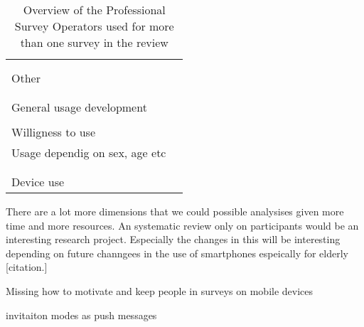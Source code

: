 \begin{table}
\begin{tabular}{ll}
        & \cite{antoun_effects_2017, mavletova_sensitive_2013}\\
        & \cite{toninelli_smartphones_2016}\\
         Other & \cite{de_mobile_2014, mavletova_sensitive_2013}\\
        & \cite{toninelli_smartphones_2016, keusch_using_2021}\\
        & \cite{toepoel_what_2014}\\
        General usage development & \cite{revilla_do_2016, gummer_does_2019}\\
        & \cite{de_mobile_2014, wells_what_2015}\\
        Willigness to use & \cite{wenz_willingness_2019}\\
        Usage dependig on sex, age etc & \cite{haan_can_2019, keusch_coverage_2020}\\
        & \cite{revilla_do_2016, antoun_simultaneous_2019}\\
        & \cite{keusch_using_2021}\\
        Device use & \cite{keusch_coverage_2020}\\
		\bottomrule 
	\end{tabular}
	\caption{Overview of the Professional Survey Operators used for more than one survey in the review}
	\label{tab: participants}
\end{table}




There are a lot more dimensions that we could possible analysises given more time and more resources. An systematic review only on participants would be an interesting research project. Especially the changes in this will be interesting depending on future channgees in the use of smartphones espeically for elderly [citation.]

Missing how to motivate and keep people in surveys on mobile devices

invitaiton modes as push messages